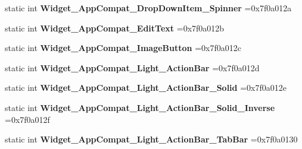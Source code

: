 \begin{DoxyCompactItemize}
\item 
\mbox{\label{classandroid_1_1support_1_1design_1_1R_1_1style_a4582963d784eea321b0a94f6b3fcdb90}} 
static int {\bfseries Widget\+\_\+\+App\+Compat\+\_\+\+Drop\+Down\+Item\+\_\+\+Spinner} =0x7f0a012a
\item 
\mbox{\label{classandroid_1_1support_1_1design_1_1R_1_1style_a107a45066ffbbe5ba2d75a8b1a7fc12d}} 
static int {\bfseries Widget\+\_\+\+App\+Compat\+\_\+\+Edit\+Text} =0x7f0a012b
\item 
\mbox{\label{classandroid_1_1support_1_1design_1_1R_1_1style_ad348a563039ecc1cca7950b4971c10b5}} 
static int {\bfseries Widget\+\_\+\+App\+Compat\+\_\+\+Image\+Button} =0x7f0a012c
\item 
\mbox{\label{classandroid_1_1support_1_1design_1_1R_1_1style_a2cea21b504a761f460fd4d1fb423ffc6}} 
static int {\bfseries Widget\+\_\+\+App\+Compat\+\_\+\+Light\+\_\+\+Action\+Bar} =0x7f0a012d
\item 
\mbox{\label{classandroid_1_1support_1_1design_1_1R_1_1style_aad37b9c5bf39e1f06f039fab801d710c}} 
static int {\bfseries Widget\+\_\+\+App\+Compat\+\_\+\+Light\+\_\+\+Action\+Bar\+\_\+\+Solid} =0x7f0a012e
\item 
\mbox{\label{classandroid_1_1support_1_1design_1_1R_1_1style_a5debd47b15a820e34df9dadd6fbb7ff3}} 
static int {\bfseries Widget\+\_\+\+App\+Compat\+\_\+\+Light\+\_\+\+Action\+Bar\+\_\+\+Solid\+\_\+\+Inverse} =0x7f0a012f
\item 
\mbox{\label{classandroid_1_1support_1_1design_1_1R_1_1style_a34b080350adb85e849ee53ce111fed3d}} 
static int {\bfseries Widget\+\_\+\+App\+Compat\+\_\+\+Light\+\_\+\+Action\+Bar\+\_\+\+Tab\+Bar} =0x7f0a0130
\item 
\mbox{\label{classandroid_1_1support_1_1design_1_1R_1_1style_a6131f5a3bfe13659777a41332550e1ac}} 

\end{DoxyCompactItemize}
